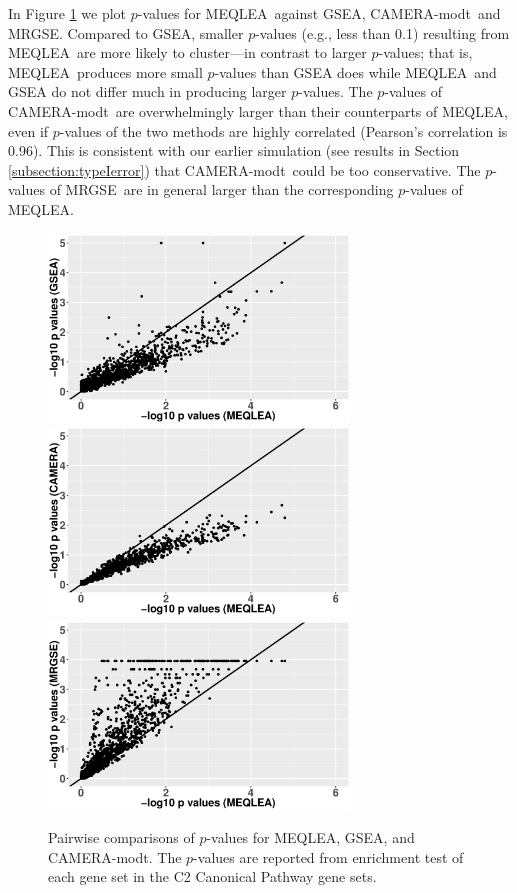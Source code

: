 \documentclass[a4,center,fleqn]{NAR}
\newcommand{\OurMethod}{MEQLEA}
\newcommand{\CMT}{CAMERA-modt}
\newcommand{\genr}{MRGSE}
\begin{document}
	In Figure \ref{fig:HDdatap} we plot $p$-values for \OurMethod~against GSEA, \CMT~and \genr.
	Compared to GSEA, smaller $p$-values (e.g., less than 0.1) resulting from \OurMethod~are more likely
	to cluster---in contrast to larger $p$-values; that is, \OurMethod~produces more small $p$-values
	than GSEA does while \OurMethod~and GSEA do not differ much in producing larger $p$-values. The
	$p$-values of \CMT~are overwhelmingly larger than their counterparts of \OurMethod, even if
	$p$-values of the two methods are highly correlated (Pearson's correlation is 0.96). This is
	consistent with our earlier simulation (see results in Section \ref{subsection:typeIerror}) that
	\CMT~could be too conservative. The $p$-values of \genr~are in general larger than the corresponding
	$p$-values of \OurMethod. 
	\begin{figure}[!ht]
		\begin{center}
			\includegraphics[width=8cm,height=5cm]{Figures/MEQLEA_GSEA.eps}
			\includegraphics[width=8cm,height=5cm]{Figures/MEQLEA_Camera.eps}
			\includegraphics[width=8cm,height=5cm]{Figures/MEQLEA_MRGSE.eps}
		\end{center} 
		\caption{Pairwise comparisons of $p$-values for \OurMethod, GSEA, and \CMT. The $p$-values are
			reported from enrichment test of each gene set in the C2 Canonical Pathway gene sets.
		}\label{fig:HDdatap}
	\end{figure} 
	
\end{document}
